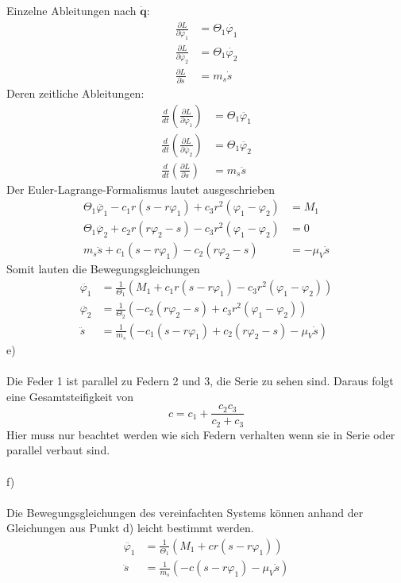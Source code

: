 Einzelne Ableitungen nach $\dot{\textbf{q}}$:
\begin{align*}
	\frac{\partial L}{\partial \dot{\varphi_1}} &= \Theta_1\dot{\varphi_1} \\
	\frac{\partial L}{\partial \dot{\varphi_2}} &= \Theta_1\dot{\varphi_2} \\
	\frac{\partial L}{\partial \dot{s}} &= m_s\dot{s}
\end{align*}
Deren zeitliche Ableitungen:
\begin{align*}
	\frac{d}{dt}\left(\frac{\partial L}{\partial \dot{\varphi_1}} \right) &= \Theta_1\ddot{\varphi_1} \\
	\frac{d}{dt}\left(\frac{\partial L}{\partial \dot{\varphi_2}} \right) &= \Theta_1\ddot{\varphi_2} \\
	\frac{d}{dt}\left(\frac{\partial L}{\partial \dot{s}} \right) &= m_s\ddot{s}
\end{align*}
Der Euler-Lagrange-Formalismus lautet ausgeschrieben
\begin{align*}
	\Theta_1\ddot{\varphi_1} - c_1r(s - r\varphi_1) + c_3r^2(\varphi_1 - \varphi_2) &= M_1 \\
	\Theta_1\ddot{\varphi_2} + c_2r(r\varphi_2 - s) - c_3r^2(\varphi_1 - \varphi_2) &= 0 \\
	m_s\ddot{s} + c_1(s - r\varphi_1) - c_2(r\varphi_2 - s) &= -\mu_V\dot{s}
\end{align*}
\newpage
\noindent
Somit lauten die Bewegungsgleichungen
\begin{align*}
	\ddot{\varphi_1} &= \frac{1}{\Theta_1}(M_1 + c_1r(s - r\varphi_1) - c_3r^2(\varphi_1 - \varphi_2))\\
	\ddot{\varphi_2} &= \frac{1}{\Theta_2}(-c_2(r\varphi_2 - s) + c_3r^2(\varphi_1 - \varphi_2)) \\
	\ddot{s} &= \frac{1}{m_s}(-c_1(s - r\varphi_1) + c_2(r\varphi_2 - s) - \mu_V\dot{s})
\end{align*}
e) \\ \\
Die Feder 1 ist parallel zu Federn 2 und 3, die Serie zu sehen sind. Daraus folgt eine Gesamtsteifigkeit von
\[
	c = c_1 + \frac{c_2c_3}{c_2 + c_3}
\]
Hier muss nur beachtet werden wie sich Federn verhalten wenn sie in Serie oder parallel verbaut sind. \\ \\
f) \\ \\
Die Bewegungsgleichungen des vereinfachten Systems können anhand der Gleichungen aus Punkt d) leicht bestimmt werden.
\begin{align*}
	\ddot{\varphi_1} &= \frac{1}{\Theta_1}(M_1 + cr(s - r\varphi_1)) \\
	\ddot{s} &= \frac{1}{m_s}(-c(s - r\varphi_1) - \mu_V\dot{s})
\end{align*}